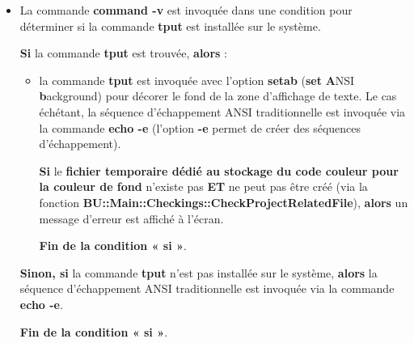 \documentclass[a4paper,10pt]{article}
\begin{document}
\begin{itemize}
    \item
    {
        \begin{justify}
            La commande \textbf{\color{cmds}command -v} est invoquée dans une condition pour déterminer si la commande \textbf{\color{cmds}tput} est installée sur le système.
        \end{justify}

        \setlength{\parskip}{1em}

        \begin{justify}
            \textbf{\color{cond}Si} la commande \textbf{\color{cmds}tput} est trouvée, \textbf{\color{cond}alors} :

            \begin{itemize}
                \item
                {
                    \begin{justify}
                        la commande \textbf{\color{cmds}tput} est invoquée avec l'option \textbf{\color{cmds}setab} (\textbf{set} \textbf{A}NSI \textbf{b}ackground) pour décorer le fond de la zone d'affichage de texte. Le cas échétant, la séquence d'échappement ANSI traditionnelle est invoquée via la commande \textbf{\color{cmds}echo -e} (l'option \textbf{\color{cmds}-e} permet de créer des séquences d'échappement).
                    \end{justify}

                    \setlength{\parskip}{2em}

                    \begin{justify}
                        \textbf{\color{cond}Si} le \textbf{\color{path}fichier temporaire dédié au stockage du code couleur pour la couleur de fond} n'existe pas \textbf{ET} ne peut pas être créé (via la fonction \textbf{\color{func}BU::Main::Checkings::CheckProjectRelatedFile}), \textbf{\color{cond}alors} un message d'erreur est affiché à l'écran.
                    \end{justify}

                    \setlength{\parskip}{1em}

                    \begin{justify}
                        \textbf{\color{cond}Fin de la condition « si »}.
                    \end{justify}
                }
            \end{itemize}
        \end{justify}

        \begin{justify}
            \textbf{\color{cond}Sinon, si} la commande \textbf{\color{cmds}tput} n'est pas installée sur le système, \textbf{\color{cond}alors} la séquence d'échappement ANSI traditionnelle est invoquée via la commande \textbf{\color{cmds}echo -e}.
        \end{justify}

        \begin{justify}
            \textbf{\color{cond}Fin de la condition « si »}.
        \end{justify}
    }
\end{itemize}
\end{document}
